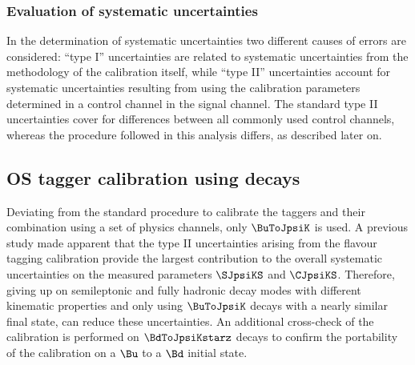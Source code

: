 \subsubsection{Evaluation of systematic uncertainties}
\label{sec:flavour_tagging:calibration:method:systematics}

In the determination of systematic uncertainties two different causes of errors
are considered: \enquote{type I} uncertainties are related to systematic
uncertainties from the methodology of the calibration itself, while
\enquote{type II} uncertainties account for systematic uncertainties resulting
from using the calibration parameters determined in a control channel in the
signal channel. The standard type II uncertainties cover for differences between
all commonly used control channels, whereas the procedure followed in this
analysis differs, as described later on.

\subsection[
  head={\Acs*{OS} tagger calibration using \BuToJpsiK decays},
  tocentry={\Acl*{OS} tagger calibration using \BuToJpsiKHyperref decays}
]{\Acl*{OS} tagger calibration using \BuToJpsiKbfsf decays}
\label{sec:flavour_tagging:calibration:os}

Deviating from the standard procedure to calibrate the \OS taggers and their
combination using a set of physics channels, only $\BuToJpsiK$ is used. A
previous study \cite{Aaij:1497268} made apparent that the type II uncertainties
arising from the flavour tagging calibration provide the largest contribution to
the overall systematic uncertainties on the measured \CP parameters $\SJpsiKS$
and $\CJpsiKS$. Therefore, giving up on semileptonic and fully hadronic decay
modes with different kinematic properties and only using $\BuToJpsiK$ decays
with a nearly similar final state, can reduce these uncertainties. An additional
cross-check of the calibration is performed on $\BdToJpsiKstarz$ decays to
confirm the portability of the calibration on a $\Bu$ to a $\Bd$ initial state.

